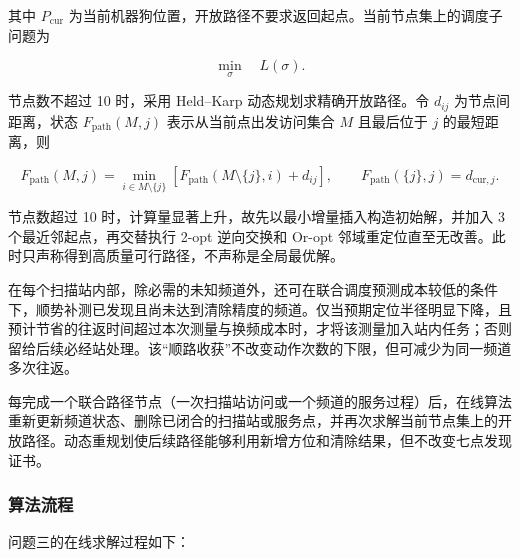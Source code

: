 其中 $P_{\mathrm{cur}}$ 为当前机器狗位置，开放路径不要求返回起点。当前节点集上的调度子问题为

\begin{equation}
\min_{\sigma}\quad L(\sigma).
\label{eq:q3_route_problem}
\end{equation}

节点数不超过 10 时，采用 Held--Karp 动态规划求精确开放路径。令 $d_{ij}$ 为节点间距离，状态 $F_{\mathrm{path}}(M,j)$ 表示从当前点出发访问集合 $M$ 且最后位于 $j$ 的最短距离，则

\begin{equation}
F_{\mathrm{path}}(M,j)
=
\min_{i\in M\setminus\{j\}}
\left[
F_{\mathrm{path}}(M\setminus\{j\},i)+d_{ij}
\right],
\qquad
F_{\mathrm{path}}(\{j\},j)=d_{\mathrm{cur},j}.
\label{eq:q3_held_karp}
\end{equation}

节点数超过 10 时，计算量显著上升，故先以最小增量插入构造初始解，并加入 3 个最近邻起点，再交替执行 2-opt 逆向交换和 Or-opt 邻域重定位直至无改善。此时只声称得到高质量可行路径，不声称是全局最优解。

在每个扫描站内部，除必需的未知频道外，还可在联合调度预测成本较低的条件下，顺势补测已发现且尚未达到清除精度的频道。仅当预期定位半径明显下降，且预计节省的往返时间超过本次测量与换频成本时，才将该测量加入站内任务；否则留给后续必经站处理。该“顺路收获”不改变动作次数的下限，但可减少为同一频道多次往返。

每完成一个联合路径节点（一次扫描站访问或一个频道的服务过程）后，在线算法重新更新频道状态、删除已闭合的扫描站或服务点，并再次求解当前节点集上的开放路径。动态重规划使后续路径能够利用新增方位和清除结果，但不改变七点发现证书。

\subsubsection{算法流程}

问题三的在线求解过程如下：

